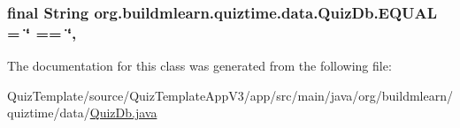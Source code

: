 \subsubsection[{\texorpdfstring{E\+Q\+U\+AL}{EQUAL}}]{\setlength{\rightskip}{0pt plus 5cm}final String org.\+buildmlearn.\+quiztime.\+data.\+Quiz\+Db.\+E\+Q\+U\+AL = \char`\"{} == \char`\"{}\hspace{0.3cm}{\ttfamily [static]}, {\ttfamily [private]}}\hypertarget{classorg_1_1buildmlearn_1_1quiztime_1_1data_1_1QuizDb_aff205cc6fcc451deba01771b0ecd3ff8}{}\label{classorg_1_1buildmlearn_1_1quiztime_1_1data_1_1QuizDb_aff205cc6fcc451deba01771b0ecd3ff8}


The documentation for this class was generated from the following file\+:\begin{DoxyCompactItemize}
\item 
Quiz\+Template/source/\+Quiz\+Template\+App\+V3/app/src/main/java/org/buildmlearn/quiztime/data/\hyperlink{QuizDb_8java}{Quiz\+Db.\+java}\end{DoxyCompactItemize}
